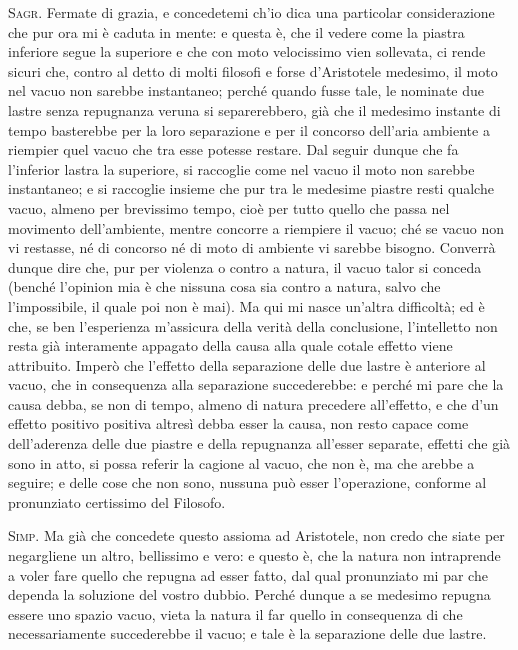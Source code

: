 \documentclass[11pt,twoside,openany]{book}
\newcommand{\speaker}[1]{\textcolor{rubric}{\textsc{#1}}\space}
\begin{document}
\speaker{Sagr.} Fermate di grazia, e concedetemi ch'io dica una particolar considerazione che pur ora mi è caduta in mente: e questa è, che il vedere come la piastra inferiore segue la superiore e che con moto velocissimo vien sollevata, ci rende sicuri che, contro al detto di molti filosofi e forse d'Aristotele medesimo, il moto nel vacuo non sarebbe instantaneo; perché quando fusse tale, le nominate due lastre senza repugnanza veruna si separerebbero, già che il medesimo instante di tempo basterebbe per la loro separazione e per il concorso dell'aria ambiente a riempier quel vacuo che tra esse potesse restare. Dal seguir dunque che fa l'inferior lastra la superiore, si raccoglie come nel vacuo il moto non sarebbe instantaneo; e si raccoglie insieme che pur tra le medesime piastre resti qualche vacuo, almeno per brevissimo tempo, cioè per tutto quello che passa nel movimento dell'ambiente, mentre concorre a riempiere il vacuo; ché se vacuo non vi restasse, né di concorso né di moto di ambiente vi sarebbe bisogno. Converrà dunque dire che, pur per violenza o contro a natura, il vacuo talor si conceda (benché l'opinion mia è che nissuna cosa sia contro a natura, salvo che l'impossibile, il quale poi non è mai). Ma qui mi nasce un'altra difficoltà; ed è che, se ben l'esperienza m'assicura della verità della conclusione, l'intelletto non resta già interamente appagato della causa alla quale cotale effetto viene attribuito. Imperò che l'effetto della separazione delle due lastre è anteriore al vacuo, che in consequenza alla separazione succederebbe: e perché mi pare che la causa debba, se non di tempo, almeno di natura precedere all'effetto, e che d'un effetto positivo positiva altresì debba esser la causa, non resto capace come dell'aderenza delle due piastre e della repugnanza all'esser separate, effetti che già sono in atto, si possa referir la cagione al vacuo, che non è, ma che arebbe a seguire; e delle cose che non sono, nussuna può esser l'operazione, conforme al pronunziato certissimo del Filosofo.

\speaker{Simp.} Ma già che concedete questo assioma ad Aristotele, non credo che siate per negargliene un altro, bellissimo e vero: e questo è, che la natura non intraprende a voler fare quello che repugna ad esser fatto, dal qual pronunziato mi par che dependa la soluzione del vostro dubbio. Perché dunque a se medesimo repugna essere uno spazio vacuo, vieta la natura il far quello in consequenza di che necessariamente succederebbe il vacuo; e tale è la separazione delle due lastre.
\end{document}

